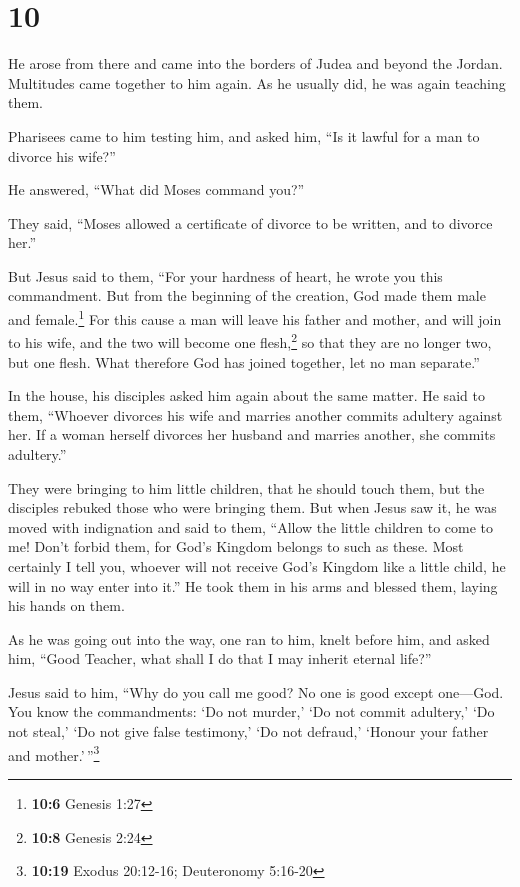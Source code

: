 \hypertarget{section-9}{%
\section{10}\label{section-9}}

 He arose from there and came into the borders of Judea
and beyond the Jordan. Multitudes came together to him again. As he
usually did, he was again teaching them.

 Pharisees came to him testing him, and asked him, ``Is it
lawful for a man to divorce his wife?''

 He answered, ``What did Moses command you?''

 They said, ``Moses allowed a certificate of divorce to be
written, and to divorce her.''

 But Jesus said to them, ``For your hardness of heart, he
wrote you this commandment.  But from the beginning of the
creation, God made them male and female.\footnote{\textbf{10:6} Genesis
  1:27}  For this cause a man will leave his father and
mother, and will join to his wife,  and the two will
become one flesh,\footnote{\textbf{10:8} Genesis 2:24} so that they are
no longer two, but one flesh.  What therefore God has
joined together, let no man separate.''

 In the house, his disciples asked him again about the
same matter.  He said to them, ``Whoever divorces his
wife and marries another commits adultery against her. 
If a woman herself divorces her husband and marries another, she commits
adultery.''

 They were bringing to him little children, that he
should touch them, but the disciples rebuked those who were bringing
them.  But when Jesus saw it, he was moved with
indignation and said to them, ``Allow the little children to come to me!
Don't forbid them, for God's Kingdom belongs to such as these.
 Most certainly I tell you, whoever will not receive
God's Kingdom like a little child, he will in no way enter into it.''
 He took them in his arms and blessed them, laying his
hands on them.

 As he was going out into the way, one ran to him, knelt
before him, and asked him, ``Good Teacher, what shall I do that I may
inherit eternal life?''

 Jesus said to him, ``Why do you call me good? No one is
good except one---God.  You know the commandments: `Do
not murder,' `Do not commit adultery,' `Do not steal,' `Do not give
false testimony,' `Do not defraud,' `Honour your father and
mother.'\,''\footnote{\textbf{10:19} Exodus 20:12-16; Deuteronomy
  5:16-20}


